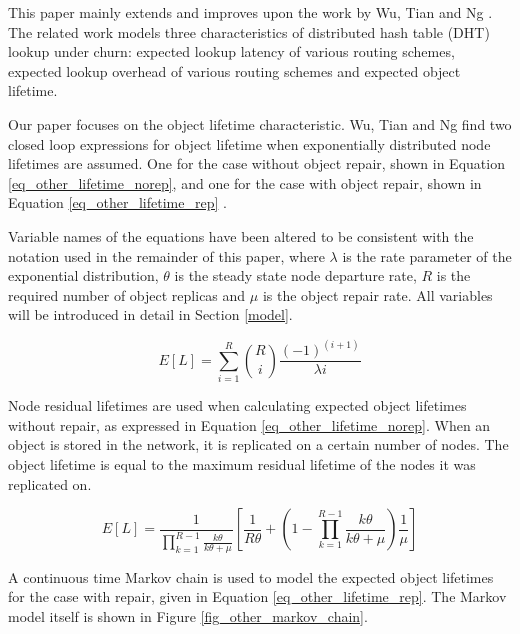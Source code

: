 \documentclass[10pt,a4paper,conference]{IEEEtran}
\begin{document}
This paper mainly extends and improves upon the work by Wu, Tian and Ng \cite{replication_article}. The related work models three characteristics of distributed hash table (DHT) lookup under churn: expected lookup latency of various routing schemes, expected lookup overhead of various routing schemes and expected object lifetime.

Our paper focuses on the object lifetime characteristic. Wu, Tian and Ng find two closed loop expressions for object lifetime when exponentially distributed node lifetimes are assumed. One for the case without object repair, shown in Equation \eqref{eq_other_lifetime_norep}, and one for the case with object repair, shown in Equation \eqref{eq_other_lifetime_rep} \cite{replication_article}.

Variable names of the equations have been altered to be consistent with the notation used in the remainder of this paper, where $\lambda$ is the rate parameter of the exponential distribution, $\theta$ is the steady state node departure rate, $R$ is the required number of object replicas and $\mu$ is the object repair rate. All variables will be introduced in detail in Section \ref{model}.

\begin{equation} \label{eq_other_lifetime_norep}
    E[L] = \sum_{i = 1}^{R}{{R}\choose{i}}\frac{(-1)^{(i+1)}}{\lambda i}
\end{equation}

Node residual lifetimes are used when calculating expected object lifetimes without repair, as expressed in Equation \eqref{eq_other_lifetime_norep}. When an object is stored in the network, it is replicated on a certain number of nodes. The object lifetime is equal to the maximum residual lifetime of the nodes it was replicated on.

\begin{equation} \label{eq_other_lifetime_rep}
    E[L] = \frac{1}{\prod_{k=1}^{R-1}\frac{k\theta}{k\theta+\mu}} \left[\frac{1}{R\theta} + \left(1 - \prod_{k=1}^{R-1}\frac{k\theta}{k\theta + \mu}\right)\frac{1}{\mu}\right]
\end{equation}

A continuous time Markov chain is used to model the expected object lifetimes for the case with repair, given in Equation \eqref{eq_other_lifetime_rep}. The Markov model itself is shown in Figure \ref{fig_other_markov_chain}.
\end{document}
